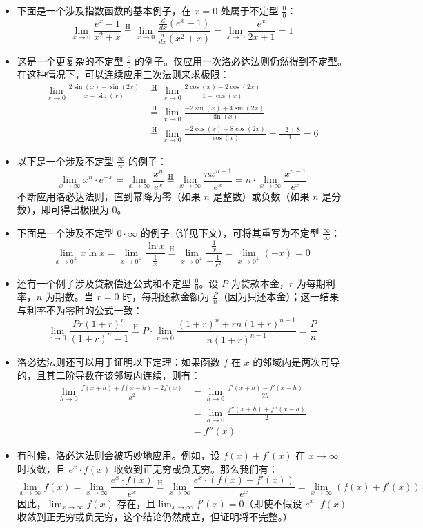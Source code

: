 \begin{itemize}
\item 下面是一个涉及指数函数的基本例子，在 $x = 0$ 处属于不定型 $\frac{0}{0}$：
$$
\lim_{x \to 0} \frac{e^x - 1}{x^2 + x}
\stackrel{\mathrm{H}}{=}
\lim_{x \to 0} \frac{\frac{d}{dx}(e^x - 1)}{\frac{d}{dx}(x^2 + x)}
=
\lim_{x \to 0} \frac{e^x}{2x + 1}
= 1~
$$
\item 这是一个更复杂的不定型 $\frac{0}{0}$ 的例子。仅应用一次洛必达法则仍然得到不定型。在这种情况下，可以连续应用三次法则来求极限：
$$
\begin{aligned}
\lim_{x \to 0} \frac{2\sin(x) - \sin(2x)}{x - \sin(x)}
&\stackrel{\mathrm{H}}{=}
\lim_{x \to 0} \frac{2\cos(x) - 2\cos(2x)}{1 - \cos(x)} \\
&\stackrel{\mathrm{H}}{=}
\lim_{x \to 0} \frac{-2\sin(x) + 4\sin(2x)}{\sin(x)} \\
&\stackrel{\mathrm{H}}{=}
\lim_{x \to 0} \frac{-2\cos(x) + 8\cos(2x)}{\cos(x)} =
\frac{-2 + 8}{1} = 6
\end{aligned}~
$$
\item 以下是一个涉及不定型 $\frac{\infty}{\infty}$ 的例子：
$$
\lim_{x \to \infty} x^n \cdot e^{-x}
=
\lim_{x \to \infty} \frac{x^n}{e^x}
\stackrel{\mathrm{H}}{=}
\lim_{x \to \infty} \frac{n x^{n-1}}{e^x}
= n \cdot \lim_{x \to \infty} \frac{x^{n-1}}{e^x}~
$$
不断应用洛必达法则，直到幂降为零（如果 $n$ 是整数）或负数（如果 $n$ 是分数），即可得出极限为 0。
\item 下面是一个涉及不定型 $0 \cdot \infty$ 的例子（详见下文），可将其重写为不定型 $\frac{\infty}{\infty}$：
$$
\lim_{x \to 0^+} x \ln x
=
\lim_{x \to 0^+} \frac{\ln x}{\frac{1}{x}}
\stackrel{\mathrm{H}}{=}
\lim_{x \to 0^+} \frac{\frac{1}{x}}{-\frac{1}{x^2}}
=
\lim_{x \to 0^+} (-x) = 0~
$$
\item 还有一个例子涉及贷款偿还公式和不定型 $\frac{0}{0}$。设 $P$ 为贷款本金，$r$ 为每期利率，$n$ 为期数。当 $r = 0$ 时，每期还款金额为 $\frac{P}{n}$（因为只还本金）；这一结果与利率不为零时的公式一致：
$$
\lim_{r \to 0} \frac{Pr(1+r)^n}{(1+r)^n - 1}
\stackrel{\mathrm{H}}{=}
P \cdot \lim_{r \to 0} \frac{(1+r)^n + rn(1+r)^{n-1}}{n(1+r)^{n-1}} = \frac{P}{n}~
$$
\item 洛必达法则还可以用于证明以下定理：如果函数 $f$ 在 $x$ 的邻域内是两次可导的，且其二阶导数在该邻域内连续，则有：
$$
\begin{aligned}
\lim_{h \to 0} \frac{f(x+h) + f(x-h) - 2f(x)}{h^2}
&= \lim_{h \to 0} \frac{f'(x+h) - f'(x-h)}{2h}\\
&= \lim_{h \to 0} \frac{f''(x+h) + f''(x-h)}{2}\\
&= f''(x)
\end{aligned}~
$$
\item 有时候，洛必达法则会被巧妙地应用。例如，设 $f(x) + f'(x)$ 在 $x \to \infty$ 时收敛，且 $e^x \cdot f(x)$ 收敛到正无穷或负无穷。那么我们有：
$$
\lim_{x \to \infty} f(x)
= \lim_{x \to \infty} \frac{e^x \cdot f(x)}{e^x}
\stackrel{\mathrm{H}}{=}
\lim_{x \to \infty} \frac{e^x \cdot (f(x) + f'(x))}{e^x}
= \lim_{x \to \infty} (f(x) + f'(x))~
$$
因此，$\lim_{x \to \infty} f(x)$ 存在，且$\lim_{x \to \infty} f'(x) = 0$（即使不假设 $e^x \cdot f(x)$ 收敛到正无穷或负无穷，这个结论仍然成立，但证明将不完整。）
\end{itemize}
